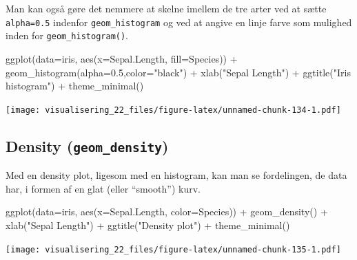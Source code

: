 \documentclass[
]{book}
\newenvironment{Shaded}{\begin{snugshade}}{\end{snugshade}}
\newcommand{\AttributeTok}[1]{\textcolor[rgb]{0.77,0.63,0.00}{#1}}
\newcommand{\FloatTok}[1]{\textcolor[rgb]{0.00,0.00,0.81}{#1}}
\newcommand{\FunctionTok}[1]{\textcolor[rgb]{0.00,0.00,0.00}{#1}}
\newcommand{\NormalTok}[1]{#1}
\newcommand{\SpecialCharTok}[1]{\textcolor[rgb]{0.00,0.00,0.00}{#1}}
\newcommand{\StringTok}[1]{\textcolor[rgb]{0.31,0.60,0.02}{#1}}
\begin{document}
Man kan også gøre det nemmere at skelne imellem de tre arter ved at sætte \texttt{alpha=0.5} indenfor \texttt{geom\_histogram} og ved at angive en linje farve som mulighed inden for \texttt{geom\_histogram()}.

\begin{Shaded}
\begin{Highlighting}[]
\FunctionTok{ggplot}\NormalTok{(}\AttributeTok{data=}\NormalTok{iris, }\FunctionTok{aes}\NormalTok{(}\AttributeTok{x=}\NormalTok{Sepal.Length, }\AttributeTok{fill=}\NormalTok{Species)) }\SpecialCharTok{+} 
  \FunctionTok{geom\_histogram}\NormalTok{(}\AttributeTok{alpha=}\FloatTok{0.5}\NormalTok{,}\AttributeTok{color=}\StringTok{"black"}\NormalTok{) }\SpecialCharTok{+} 
  \FunctionTok{xlab}\NormalTok{(}\StringTok{"Sepal Length"}\NormalTok{) }\SpecialCharTok{+} 
  \FunctionTok{ggtitle}\NormalTok{(}\StringTok{"Iris histogram"}\NormalTok{) }\SpecialCharTok{+} 
  \FunctionTok{theme\_minimal}\NormalTok{()}
\end{Highlighting}
\end{Shaded}

\texttt{[image: visualisering\_22\_files/figure-latex/unnamed-chunk-134-1.pdf]}

\hypertarget{density-geom_density}{%
\subsection{\texorpdfstring{Density (\texttt{geom\_density})}{Density (geom\_density)}}\label{density-geom_density}}

Med en density plot, ligesom med en histogram, kan man se fordelingen, de data har, i formen af en glat (eller ``smooth'') kurv.

\begin{Shaded}
\begin{Highlighting}[]
\FunctionTok{ggplot}\NormalTok{(}\AttributeTok{data=}\NormalTok{iris, }\FunctionTok{aes}\NormalTok{(}\AttributeTok{x=}\NormalTok{Sepal.Length, }\AttributeTok{color=}\NormalTok{Species)) }\SpecialCharTok{+} 
  \FunctionTok{geom\_density}\NormalTok{() }\SpecialCharTok{+} 
  \FunctionTok{xlab}\NormalTok{(}\StringTok{"Sepal Length"}\NormalTok{) }\SpecialCharTok{+} 
  \FunctionTok{ggtitle}\NormalTok{(}\StringTok{"Density plot"}\NormalTok{) }\SpecialCharTok{+}
  \FunctionTok{theme\_minimal}\NormalTok{()}
\end{Highlighting}
\end{Shaded}

\texttt{[image: visualisering\_22\_files/figure-latex/unnamed-chunk-135-1.pdf]}
\end{document}
